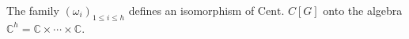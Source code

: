 The family $(\omega_i)_{1 \leq i \leq h}$ defines an isomorphism of $\text{Cent. } C[G]$ onto the algebra $\mathbb{C}^h = \mathbb{C} \times \cdots \times \mathbb{C}$.

